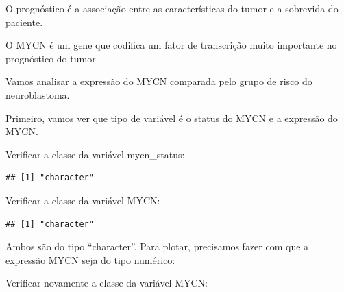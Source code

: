 \documentclass[
]{book}
\newenvironment{Shaded}{\begin{snugshade}}{\end{snugshade}}
\newcommand{\FunctionTok}[1]{\textcolor[rgb]{0.13,0.29,0.53}{\textbf{#1}}}
\newcommand{\NormalTok}[1]{#1}
\newcommand{\OtherTok}[1]{\textcolor[rgb]{0.56,0.35,0.01}{#1}}
\newcommand{\SpecialCharTok}[1]{\textcolor[rgb]{0.81,0.36,0.00}{\textbf{#1}}}
\begin{document}
O prognóstico é a associação entre as características do tumor e a sobrevida do paciente.

O MYCN é um gene que codifica um fator de transcrição muito importante no prognóstico do tumor.

Vamos analisar a expressão do MYCN comparada pelo grupo de risco do neuroblastoma.

Primeiro, vamos ver que tipo de variável é o status do MYCN e a expressão do MYCN.

Verificar a classe da variável mycn\_status:

\begin{Shaded}
\end{Shaded}

\begin{verbatim}
## [1] "character"
\end{verbatim}

Verificar a classe da variável MYCN:

\begin{Shaded}
\end{Shaded}

\begin{verbatim}
## [1] "character"
\end{verbatim}

Ambos são do tipo ``character''. Para plotar, precisamos fazer com que a expressão MYCN seja do tipo numérico:

\begin{Shaded}
\end{Shaded}

Verificar novamente a classe da variável MYCN:

\begin{Shaded}
\end{Shaded}
\end{document}
